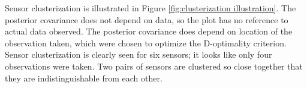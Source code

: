 Sensor clusterization is illustrated in Figure \ref{fig:clusterization
  illustration}. The posterior covariance does not depend on data, so
the plot has no reference to actual data observed. The posterior
covariance does depend on location of the observation taken, which
were chosen to optimize the D-optimality criterion. Sensor
clusterization is clearly seen for six sensors; it looks like only
four observations were taken. Two pairs of sensors are clustered so
close together that they are indistinguishable from each other.


